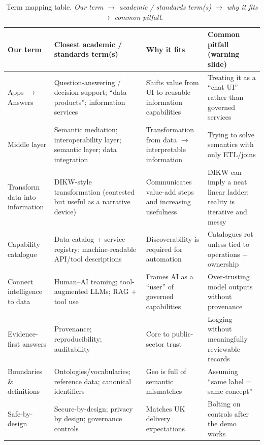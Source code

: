 \begin{table}[ht]
\centering
\caption{Term mapping table. \textit{Our term} $\rightarrow$ \textit{academic / standards term(s)} $\rightarrow$ \textit{why it fits} $\rightarrow$ \textit{common pitfall}.}
\label{tab:term-mapping}
\small
\setlength{\tabcolsep}{4pt}
\renewcommand{\arraystretch}{1.25}
\begin{tabularx}{\textwidth}{>{\raggedright\arraybackslash}p{} >{\raggedright\arraybackslash}p{} >{\raggedright\arraybackslash}p{} >{\raggedright\arraybackslash}X}
\toprule
\textbf{Our term} & \textbf{Closest academic / standards term(s)} & \textbf{Why it fits} & \textbf{Common pitfall (warning slide)} \\
\midrule
Apps $\rightarrow$ Answers & Question-answering / decision support; ``data products''; information services & Shifts value from UI to reusable information capabilities & Treating it as a ``chat UI'' rather than governed services \\
\addlinespace
Middle layer & Semantic mediation; interoperability layer; semantic layer; data integration & Transformation from data $\rightarrow$ interpretable information & Trying to solve semantics with only ETL/joins \\
\addlinespace
Transform data into information & DIKW-style transformation (contested but useful as a narrative device) & Communicates value-add steps and increasing usefulness & DIKW can imply a neat linear ladder; reality is iterative and messy \cite{ackoff_data_to_wisdom1989} \\
\addlinespace
Capability catalogue & Data catalog + service registry; machine-readable API/tool descriptions & Discoverability is required for automation & Catalogues rot unless tied to operations + ownership \\
\addlinespace
Connect intelligence to data & Human--AI teaming; tool-augmented LLMs; RAG + tool use & Frames AI as a ``user'' of governed capabilities & Over-trusting model outputs without provenance \\
\addlinespace
Evidence-first answers & Provenance; reproducibility; auditability & Core to public-sector trust & Logging without meaningfully reviewable records \\
\addlinespace
Boundaries \& definitions & Ontologies/vocabularies; reference data; canonical identifiers & Geo is full of semantic mismatches & Assuming ``same label = same concept'' \\
\addlinespace
Safe-by-design & Secure-by-design; privacy by design; governance controls & Matches UK delivery expectations \cite{ncsc_secure_ai_guidelines,ico_ai_data_protection,data_ai_ethics_framework} & Bolting on controls after the demo works \\
\bottomrule
\end{tabularx}
\end{table}
